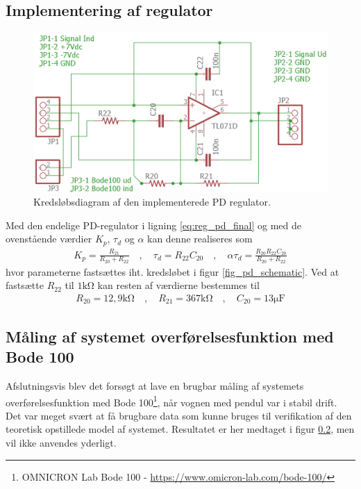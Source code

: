 \subsection{Implementering af regulator}
\begin{figure}[h!]
\centering
\includegraphics[width=.8\textwidth]{billeder/pd_schematic.png}
\caption{Kredsløbsdiagram af den implementerede PD regulator.}
\label{fig:pd_schematic}
\end{figure}
Med den endelige PD-regulator i ligning \ref{eq:reg_pd_final} og med de ovenstående værdier $K_p$, $\tau_d$ og $\alpha$ kan denne realiseres \cite[s. 349]{Reg2015} som
\begin{align}
K_p = \frac{R_{21}}{R_{20} + R_{22}} \quad , \quad \tau_d = R_{22}C_{20} \quad, \quad \alpha\tau_d = \frac{R_{20} R_{22} C_{20}}{R_{20} + R_{22}}
\end{align}
hvor parameterne fastsættes iht. kredsløbet i figur \ref{fig_pd_schematic}.
Ved at fastsætte $R_{22}$ til $1\si{\kilo\ohm}$ kan resten af værdierne bestemmes til
\begin{align}
R_{20}=12,9\si{\kilo\ohm} \quad, \quad R_{21}=367\si{\kilo\ohm} \quad, \quad C_{20} = 13\si{\micro\farad}
\end{align}

\subsection{Måling af systemet overførelsesfunktion med Bode 100}
Afslutningsvis blev det forsøgt at lave en brugbar måling af systemets overførelsesfunktion med Bode 100\footnote{OMNICRON Lab Bode 100 - \url{https://www.omicron-lab.com/bode-100/}}, når vognen med pendul var i stabil drift.
Det var meget svært at få brugbare data som kunne bruges til verifikation af den teoretisk opstillede model af systemet.
Resultatet er her medtaget i figur \ref{}, men vil ikke anvendes yderligt.

